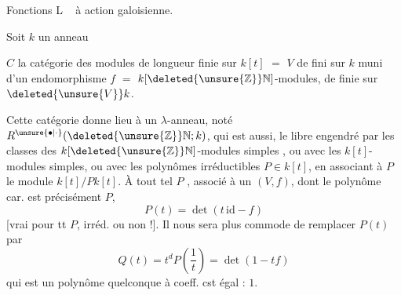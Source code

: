 \qquad Fonctions L \textendash\  à action galoisienne.

Soit $k$ un  anneau

  $C$ la catégorie des modules de longueur finie sur $k[t]$ $=$  $V$  de  fini sur $k$ muni d'un endomorphisme $f$ $=$ $k[\deleted{\unsure{\mathbb{Z}}}\mathbb{N}]$-modules,  de  finie sur $\deleted{\unsure{V}}k$.

Cette catégorie donne lieu à un $\lambda$-anneau, noté $R^{\unsure{\bullet|\cdot}}(\deleted{\unsure{\mathbb{Z}}}\mathbb{N};k)$, qui est aussi,  le   libre engendré par les classes des $k[\deleted{\unsure{\mathbb{Z}}}\mathbb{N}]$-modules simples , ou avec les $k[t]$-modules simples, ou avec les polynômes  irréductibles $P\in k[t]$, en associant à $P$ le module $k[t]/Pk[t]$. À tout tel $P$ ,  associé à un $(V,f)$, dont le polynôme car. est précisément $P$,
\[
P(t)=\det(t\,\mathrm{id}-f)
\]
[vrai pour tt $P$, irréd. ou non !]. Il nous sera plus commode de remplacer $P(t)$ par
\[
Q(t)=t^dP\left(\frac{1}{t}\right)=\det(1-tf)
\]
qui est un polynôme quelconque à coeff. cst égal : $1$.
